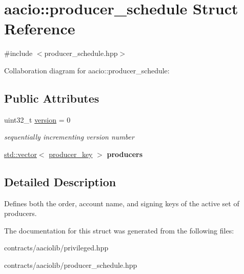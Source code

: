\hypertarget{structaacio_1_1producer__schedule}{}\section{aacio\+:\+:producer\+\_\+schedule Struct Reference}
\label{structaacio_1_1producer__schedule}


{\ttfamily \#include $<$producer\+\_\+schedule.\+hpp$>$}



Collaboration diagram for aacio\+:\+:producer\+\_\+schedule\+:
\subsection*{Public Attributes}
\begin{DoxyCompactItemize}
\item 
\mbox{\label{structaacio_1_1producer__schedule_aaf55c2e1d487ceac0775239f159eb037}} 
uint32\+\_\+t \mbox{\hyperlink{structaacio_1_1producer__schedule_aaf55c2e1d487ceac0775239f159eb037}{version}} = 0
\begin{DoxyCompactList}\small\item\em sequentially incrementing version number \end{DoxyCompactList}\item 
\mbox{\label{structaacio_1_1producer__schedule_ad499a4957aafc2eb9c36561b5506219e}} 
\mbox{\hyperlink{classstd_1_1vector}{std\+::vector}}$<$ \mbox{\hyperlink{structaacio_1_1producer__key}{producer\+\_\+key}} $>$ {\bfseries producers}
\end{DoxyCompactItemize}


\subsection{Detailed Description}
Defines both the order, account name, and signing keys of the active set of producers. 

The documentation for this struct was generated from the following files\+:\begin{DoxyCompactItemize}
\item 
contracts/aaciolib/privileged.\+hpp\item 
contracts/aaciolib/producer\+\_\+schedule.\+hpp\end{DoxyCompactItemize}

